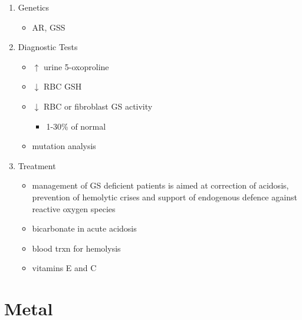 \documentclass{scrartcl}
\begin{document}
\begin{enumerate}
\item Genetics
\label{sec:orgcbf1de8}
\begin{itemize}
\item AR, GSS
\end{itemize}

\item Diagnostic Tests
\label{sec:org22edd92}
\begin{itemize}
\item \(\uparrow\) urine 5-oxoproline
\item \(\downarrow\) RBC GSH
\item \(\downarrow\) RBC or fibroblast GS activity
\begin{itemize}
\item 1-30\% of normal
\end{itemize}
\item mutation analysis
\end{itemize}

\item Treatment
\label{sec:org497e5f1}
\begin{itemize}
\item management of GS deficient patients is aimed at correction of
acidosis, prevention of hemolytic crises and support of endogenous
defence against reactive oxygen species
\item bicarbonate in acute acidosis
\item blood trxn for hemolysis
\item vitamins E and C
\end{itemize}
\end{enumerate}
\section{Metal}
\label{sec:org6862564}
\end{document}
